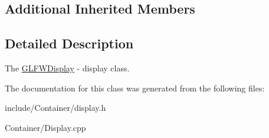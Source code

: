 \subsection*{Additional Inherited Members}


\subsection{Detailed Description}
The \hyperlink{classEngine_1_1GLFWDisplay}{G\+L\+F\+W\+Display} -\/ display class. 

The documentation for this class was generated from the following files\+:\begin{DoxyCompactItemize}
\item 
include/\+Container/display.\+h\item 
Container/Display.\+cpp\end{DoxyCompactItemize}
